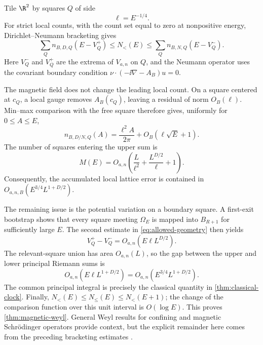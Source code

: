 Tile \(\R^2\) by squares \(Q\) of side
\begin{equation}
 \ell=E^{-1/4}.
 \label{eq:square-scale}
\end{equation}
For strict local counts, with the count set equal to zero at nonpositive
energy, Dirichlet--Neumann bracketing gives
\begin{equation}
 \sum_Q n_{B,D,Q}(E-V_Q^+)
 \leq N_{<}(E)
 \leq\sum_Q n_{B,N,Q}(E-V_Q^-).
 \label{eq:dn-bracketing}
\end{equation}
Here \(V_Q^-\) and \(V_Q^+\) are the extrema of \(V_{a,n}\) on \(Q\), and
the Neumann operator uses the covariant boundary condition
\(\nu\cdot(-\ii\nabla-A_B)u=0\).

The magnetic field does not change the leading local count.  On a square
centered at \(c_Q\), a local gauge removes \(A_B(c_Q)\), leaving a residual
of norm \(O_B(\ell)\).  Min--max comparison with the free square therefore
gives, uniformly for \(0\leq A\leq E\),
\begin{equation}
 n_{B,D/N,Q}(A)
 =\frac{\ell^2 A}{2\pi}+O_B(\ell\sqrt E+1).
 \label{eq:local-magnetic-count}
\end{equation}
The number of squares entering the upper sum is
\begin{equation}
 M(E)=O_{a,n}\!\left(
 \frac{L}{\ell^2}+\frac{L^{D/2}}{\ell}+1\right).
 \label{eq:relevant-squares}
\end{equation}
Consequently, the accumulated local lattice error is contained in
\(O_{a,n,B}(E^{3/4}L^{1+D/2})\).

The remaining issue is the potential variation on a boundary square.  A
first-exit bootstrap shows that every square meeting \(\Omega_E\) is mapped
into \(B_{R+1}\) for sufficiently large \(E\).  The second estimate in
\cref{eq:allowed-geometry} then yields
\begin{equation}
 V_Q^+-V_Q^-=O_{a,n}(E\ell L^{D/2}).
 \label{eq:potential-oscillation}
\end{equation}
The relevant-square union has area \(O_{a,n}(L)\), so the gap between the
upper and lower principal Riemann sums is
\begin{equation}
 O_{a,n}(E\ell L^{1+D/2})
 =O_{a,n}(E^{3/4}L^{1+D/2}).
 \label{eq:riemann-sum-error}
\end{equation}
The common principal integral is precisely the classical quantity in
\cref{thm:classical-clock}.  Finally,
\(N_{<}(E)\leq N_{\leq}(E)\leq N_{<}(E+1)\); the change of the comparison
function over this unit interval is \(O(\log E)\).  This proves
\cref{thm:magnetic-weyl}.  General Weyl results for confining and magnetic
Schr\"odinger operators provide context, but the explicit remainder here
comes from the preceding bracketing estimates
\citep{Rozenblum1974,HelfferRobert1982,Tachizawa1992,Ivrii2016}.

